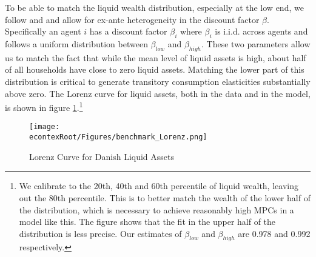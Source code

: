 \documentclass[titlepage]{\econtex}\newcommand{\texname}{ConsumptionHeterogeneity}
\begin{document}
 To be able to match the liquid wealth distribution, especially at the low end, we follow \cite{krusell_income_1998} and \cite{carroll_distribution_2017} and allow for ex-ante heterogeneity in the discount factor $\beta$. Specifically an agent $i$ has a discount factor $\beta_i$ where $\beta_i$ is i.i.d. across agents and follows a uniform distribution between $\beta_{low}$ and $\beta_{high}$. These two parameters allow us to match the fact that while the mean level of liquid assets is high, about half of all households have close to zero liquid assets. Matching the lower part of this distribution is critical to generate transitory consumption elasticities substantially above zero. The Lorenz curve for liquid assets, both in the data and in the model, is shown in figure \ref{fig:Lorenz}.\footnote{We calibrate to the 20th, 40th and 60th percentile of liquid wealth, leaving out the 80th percentile. This is to better match the wealth of the lower half of the distribution, which is necessary to achieve reasonably high MPCs in a model like this. The figure shows that the fit in the upper half of the distribution is less precise. Our estimates of $\beta_{low}$ and $\beta_{high}$ are 0.978 and 0.992 respectively.}
\begin{figure} 
		\centering
		\texttt{[image: \\econtexRoot/Figures/benchmark\_Lorenz.png]}
		\caption{Lorenz Curve for Danish Liquid Assets}
		\label{fig:Lorenz}
\end{figure}
\end{document}
